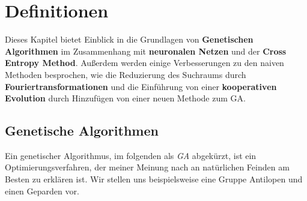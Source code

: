 
\chapter{Definitionen}


Dieses Kapitel bietet Einblick in die Grundlagen von \textbf{Genetischen Algorithmen} im Zusammenhang mit \textbf{neuronalen Netzen} und der \textbf{Cross Entropy Method}. Außerdem werden einige Verbesserungen zu den naiven Methoden besprochen, wie die Reduzierung des Suchraums durch \textbf{Fouriertransformationen} und die Einführung von einer \textbf{kooperativen Evolution} durch Hinzufügen von einer neuen Methode zum GA.

    \section{Genetische Algorithmen}


        Ein genetischer Algorithmus, im folgenden als \textit{GA} abgekürzt, ist ein Optimierungsverfahren, der meiner Meinung nach an natürlichen Feinden am Besten zu erklären ist. Wir stellen uns beispielsweise eine Gruppe Antilopen und einen Geparden vor.\\

